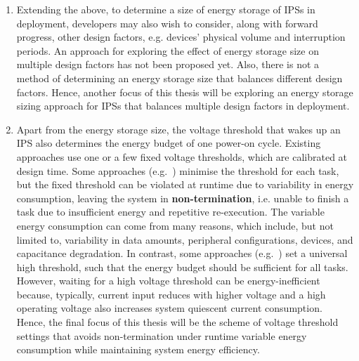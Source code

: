 \begin{enumerate}
\item 
Extending the above, to determine a size of energy storage of IPSs in deployment, developers may also wish to consider, along with forward progress, other design factors, e.g. devices' physical volume and interruption periods. 
An approach for exploring the effect of energy storage size on multiple design factors has not been proposed yet. 
Also, there is not a method of determining an energy storage size that balances different design factors. 
Hence, another focus of this thesis will be exploring an energy storage sizing approach for IPSs that balances multiple design factors in deployment.  

\item 
Apart from the energy storage size, the voltage threshold that wakes up an IPS also determines the energy budget of one power-on cycle. 
Existing approaches use one or a few fixed voltage thresholds, which are calibrated at design time. 
Some approaches (e.g.~\cite{gomez2016dynamic}) minimise the threshold for each task, but the fixed threshold can be violated at runtime due to variability in energy consumption, leaving the system in \textbf{non-termination}, i.e. unable to finish a task due to insufficient energy and repetitive re-execution. 
The variable energy consumption can come from many reasons, which include, but not limited to, variability in data amounts, peripheral configurations, devices, and capacitance degradation. 
In contrast, some approaches (e.g.~\cite{maeng2019supporting}) set a universal high threshold, such that the energy budget should be sufficient for all tasks. 
However, waiting for a high voltage threshold can be energy-inefficient because, typically, current input reduces with higher voltage and a high operating voltage also increases system quiescent current consumption. 
Hence, the final focus of this thesis will be the scheme of voltage threshold settings that avoids non-termination under runtime variable energy consumption while maintaining system energy efficiency. 

\end{enumerate}

